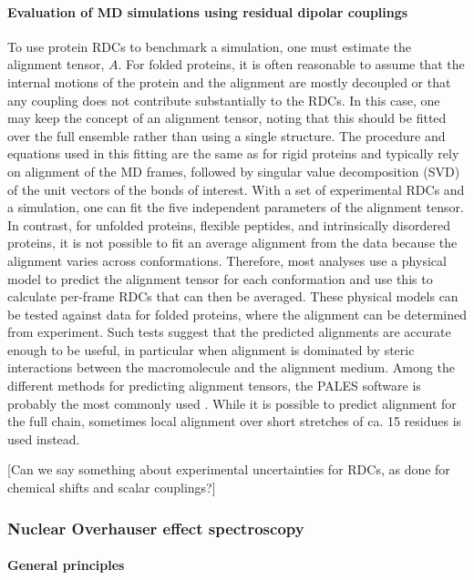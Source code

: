 \documentclass[9pt,review]{livecoms}
\begin{document}
\paragraph{Evaluation of MD simulations using residual dipolar couplings}

To use protein RDCs to benchmark a simulation, one must estimate the alignment tensor, $A$.
For folded proteins, it is often reasonable to assume that the internal motions of the protein and the alignment are mostly decoupled or that any coupling does not contribute substantially to the RDCs.
In this case, one may keep the concept of an alignment tensor, noting that this should be fitted over the full ensemble rather than using a single structure.
The procedure and equations used in this fitting are the same as for rigid proteins and typically rely on alignment of the MD frames, followed by singular value decomposition (SVD) of the unit vectors of the bonds of interest.
With a set of experimental RDCs and a simulation, one can fit the five independent parameters of the alignment tensor.
In contrast, for unfolded proteins, flexible peptides, and intrinsically disordered proteins, it is not possible to fit an average alignment from the data because the alignment varies across conformations.
Therefore, most analyses use a physical model to predict the alignment tensor for each conformation and use this to calculate per-frame RDCs that can then be averaged.
These physical models can be tested against data for folded proteins, where the alignment can be determined from experiment.
Such tests suggest that the predicted alignments are accurate enough to be useful, in particular when alignment is dominated by steric interactions between the macromolecule and the alignment medium.
Among the different methods for predicting alignment tensors, the PALES software is probably the most commonly used \cite{zweckstetter_nmr_2008}.
While it is possible to predict alignment for the full chain, sometimes local alignment over short stretches of ca. 15 residues is used instead.

[Can we say something about experimental uncertainties for RDCs, as done for chemical shifts and scalar couplings?]

\subsubsection{Nuclear Overhauser effect spectroscopy}
\label{sub2:noesy}

\paragraph{General principles}
\end{document}
